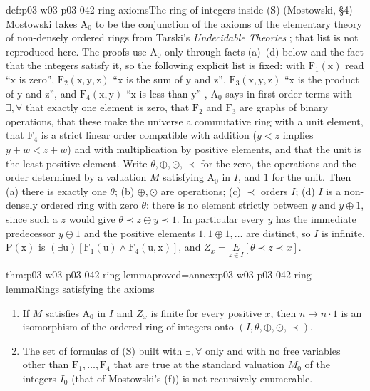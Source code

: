 \begin{hbdefinition}{def:p03-w03-p03-042-ring-axioms}{The ring of integers inside (S) (Mostowski, \S4)}
Mostowski takes \(\mathrm A_0\) to be the conjunction of the
axioms of the elementary theory of non-densely ordered rings from Tarski's
\emph{Undecidable Theories} \cite[p.~17]{Mostowski1957}; that list is not
reproduced here.  The proofs use \(\mathrm A_0\) only through facts
(a)--(d) below and the fact that the integers satisfy it, so the following
explicit list is fixed: with \(\mathrm F_1(\mathrm x)\) read ``\(\mathrm x\)
is zero'', \(\mathrm F_2(\mathrm x,\mathrm y,\mathrm z)\) ``\(\mathrm x\) is
the sum of \(\mathrm y\) and \(\mathrm z\)'', \(\mathrm F_3(\mathrm x,
\mathrm y,\mathrm z)\) ``\(\mathrm x\) is the product of \(\mathrm y\) and
\(\mathrm z\)'', and \(\mathrm F_4(\mathrm x,\mathrm y)\) ``\(\mathrm x\) is
less than \(\mathrm y\)'' \cite[p.~17]{Mostowski1957}, \(\mathrm A_0\) says
in first-order terms with \(\exists,\forall\) that exactly one element is
zero, that \(\mathrm F_2\) and \(\mathrm F_3\) are graphs of binary
operations, that these make the universe a commutative ring with a unit
element, that \(\mathrm F_4\) is a strict linear order compatible with
addition (\(y<z\) implies \(y+w<z+w\)) and with multiplication by positive
elements, and that the unit is the least positive element.  Write \(\theta,
\oplus,\odot,\prec\) for the zero, the operations and the order determined
by a valuation \(M\) satisfying \(\mathrm A_0\) in \(I\), and \(1\) for the
unit.  Then (a) there is exactly one \(\theta\); (b) \(\oplus,\odot\) are
operations; (c) \(\prec\) orders \(I\); (d) \(I\) is a non-densely ordered
ring with zero \(\theta\): there is no element strictly between \(y\) and
\(y\oplus1\), since such a \(z\) would give \(\theta\prec z\ominus y\prec
1\).  In particular every \(y\) has the immediate predecessor \(y\ominus1\)
and the positive elements \(1,1\oplus1,\ldots\) are distinct, so \(I\) is
infinite.  \(\mathrm P(\mathrm x)\) is \((\exists\mathrm u)[\mathrm
F_1(\mathrm u)\wedge\mathrm F_4(\mathrm u,\mathrm x)]\), and
\(Z_x=\underset{z\in I}{E}[\theta\prec z\prec x]\).
\end{hbdefinition}

\begin{hblemma}{thm:p03-w03-p03-042-ring-lemma}{proved=annex:p03-w03-p03-042-ring-lemma}{Rings satisfying the axioms}
\begin{enumerate}
\item If \(M\) satisfies \(\mathrm A_0\) in \(I\) and \(Z_x\) is finite
      for every positive \(x\), then \(n\mapsto n\cdot1\) is an isomorphism
      of the ordered ring of integers onto \((I,\theta,\oplus,\odot,\prec)\).
\item The set of formulas of (S) built with \(\exists,\forall\) only and
      with no free variables other than \(\mathrm F_1,\ldots,\mathrm F_4\)
      that are true at the standard valuation \(M_0\) of the integers
      \(I_0\) (that of Mostowski's (f)) is not recursively enumerable.
\end{enumerate}
\end{hblemma}

